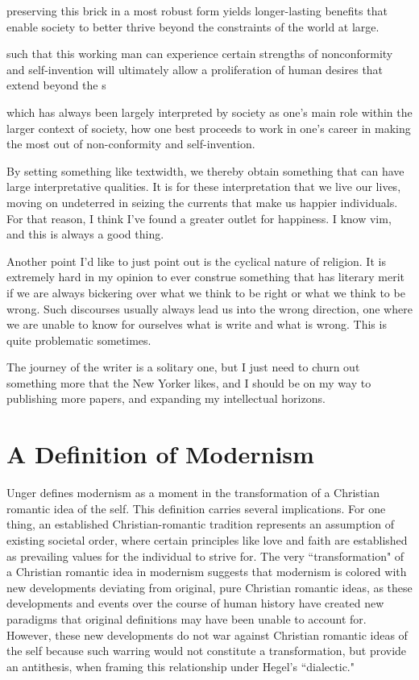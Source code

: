 \documentclass[12pt,letterpaper]{article}
\begin{document}
preserving this brick in a most robust form yields longer-lasting benefits that enable society to better thrive beyond the constraints of the world at large.

such that this working man can experience certain strengths of nonconformity and self-invention will ultimately allow a proliferation of human desires that extend beyond the s

which has always been largely interpreted
by society as one's main role within the larger context of
society, how one best proceeds to work in one's career in
making the most out of non-conformity and self-invention.


By setting something like textwidth, we thereby obtain
something that can have large interpretative qualities.  It
is for these interpretation that we live our lives, moving
on undeterred in seizing the currents that make us happier
individuals.  For that reason, I think I've found a greater
outlet for happiness.  I know vim, and this is always a
good thing.

Another point I'd like to just point out is the cyclical
nature of religion.  It is extremely hard in my opinion to
ever construe something that has literary merit if we are
always bickering over what we think to be right or what we
think to be wrong.  Such discourses usually always lead us
into the wrong direction, one where we are unable to know
for ourselves what is write and what is wrong.  This is
quite problematic sometimes.

The journey of the writer is a solitary one, but I just
need to churn out something more that the New Yorker likes,
and I should be on my way to publishing more papers, and
expanding my intellectual horizons.
\fi

\section{A Definition of Modernism}
Unger defines modernism as a moment in the transformation of a Christian romantic idea of the self.  This definition carries several implications.  For one thing, an established Christian-romantic tradition represents an assumption of existing societal order, where certain principles like love and faith are established as prevailing values for the individual to strive for.  The very ``transformation" of a Christian romantic idea in modernism suggests that modernism is colored with new developments deviating from original, pure Christian romantic ideas, as these developments and events over the course of human history have created new paradigms that original definitions may have been unable to account for.  However, these new developments do not war against Christian romantic ideas of the self because such warring would not constitute a transformation, but provide an antithesis, when framing this relationship under Hegel's ``dialectic."
\end{document}
